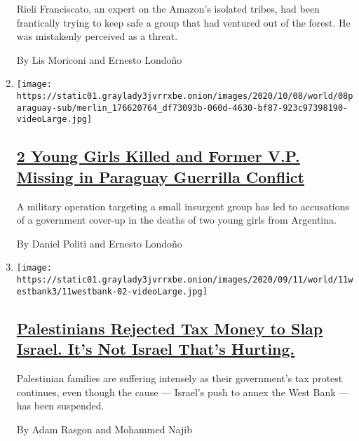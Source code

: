 \begin{enumerate}
  Rieli Franciscato, an expert on the Amazon's isolated tribes, had been
  frantically trying to keep safe a group that had ventured out of the
  forest. He was mistakenly perceived as a threat.

  By Lis Moriconi and Ernesto Londoño
\item
  \texttt{[image: https://static01.graylady3jvrrxbe.onion/images/2020/10/08/world/08paraguay-sub/merlin\_176620764\_df73093b-060d-4630-bf87-923c97398190-videoLarge.jpg]}

  \hypertarget{2-young-girls-killed-and-former-vp-missing-in-paraguay-guerrilla-conflict}{%
  \subsection{\texorpdfstring{\href{/2020/09/11/world/americas/paraguay-military-girls.html}{2
  Young Girls Killed and Former V.P. Missing in Paraguay Guerrilla
  Conflict}}{2 Young Girls Killed and Former V.P. Missing in Paraguay Guerrilla Conflict}}\label{2-young-girls-killed-and-former-vp-missing-in-paraguay-guerrilla-conflict}}

  A military operation targeting a small insurgent group has led to
  accusations of a government cover-up in the deaths of two young girls
  from Argentina.

  By Daniel Politi and Ernesto Londoño
\item
  \texttt{[image: https://static01.graylady3jvrrxbe.onion/images/2020/09/11/world/11westbank3/11westbank-02-videoLarge.jpg]}

  \hypertarget{palestinians-rejected-tax-money-to-slap-israel-its-not-israel-thats-hurting}{%
  \subsection{\texorpdfstring{\href{/2020/09/11/world/middleeast/annexation-israel-west-bank-palestinians.html}{Palestinians
  Rejected Tax Money to Slap Israel. It's Not Israel That's
  Hurting.}}{Palestinians Rejected Tax Money to Slap Israel. It's Not Israel That's Hurting.}}\label{palestinians-rejected-tax-money-to-slap-israel-its-not-israel-thats-hurting}}

  Palestinian families are suffering intensely as their government's tax
  protest continues, even though the cause --- Israel's push to annex
  the West Bank --- has been suspended.

  By Adam Rasgon and Mohammed Najib
\end{enumerate}

